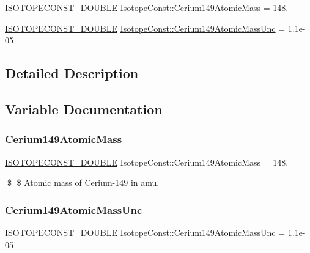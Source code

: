 \begin{DoxyCompactItemize}
\item 
\mbox{\hyperlink{group___isotope_const-_macros_ga8f45a7272ce02c0b4c65c44636ed719a}{I\+S\+O\+T\+O\+P\+E\+C\+O\+N\+S\+T\+\_\+\+D\+O\+U\+B\+LE}} \mbox{\hyperlink{group___isotope_const-_cerium-_ce149_ga48b696d4b91f426056882851687d9af4}{Isotope\+Const\+::\+Cerium149\+Atomic\+Mass}} = 148.
\item 
\mbox{\hyperlink{group___isotope_const-_macros_ga8f45a7272ce02c0b4c65c44636ed719a}{I\+S\+O\+T\+O\+P\+E\+C\+O\+N\+S\+T\+\_\+\+D\+O\+U\+B\+LE}} \mbox{\hyperlink{group___isotope_const-_cerium-_ce149_gaf765aa8235525770e7cd9c21fdabe9cf}{Isotope\+Const\+::\+Cerium149\+Atomic\+Mass\+Unc}} = 1.\+1e-\/05
\end{DoxyCompactItemize}


\subsection{Detailed Description}


\subsection{Variable Documentation}
\mbox{\label{group___isotope_const-_cerium-_ce149_ga48b696d4b91f426056882851687d9af4}} 
\subsubsection{\texorpdfstring{Cerium149\+Atomic\+Mass}{Cerium149AtomicMass}}
{\footnotesize\ttfamily \mbox{\hyperlink{group___isotope_const-_macros_ga8f45a7272ce02c0b4c65c44636ed719a}{I\+S\+O\+T\+O\+P\+E\+C\+O\+N\+S\+T\+\_\+\+D\+O\+U\+B\+LE}} Isotope\+Const\+::\+Cerium149\+Atomic\+Mass = 148.}

\$ \$ Atomic mass of Cerium-\/149 in amu. \mbox{\label{group___isotope_const-_cerium-_ce149_gaf765aa8235525770e7cd9c21fdabe9cf}} 
\subsubsection{\texorpdfstring{Cerium149\+Atomic\+Mass\+Unc}{Cerium149AtomicMassUnc}}
{\footnotesize\ttfamily \mbox{\hyperlink{group___isotope_const-_macros_ga8f45a7272ce02c0b4c65c44636ed719a}{I\+S\+O\+T\+O\+P\+E\+C\+O\+N\+S\+T\+\_\+\+D\+O\+U\+B\+LE}} Isotope\+Const\+::\+Cerium149\+Atomic\+Mass\+Unc = 1.\+1e-\/05}

